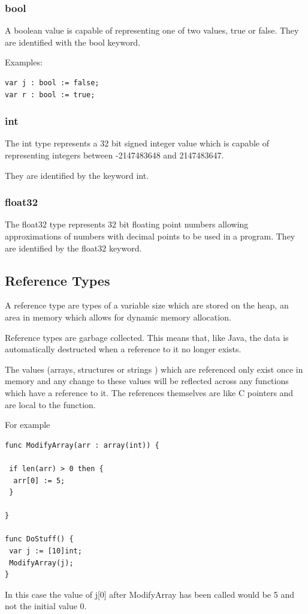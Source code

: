 \documentclass[]{final_report}
\begin{document}
\subsubsection{bool}

A boolean value is capable of representing one of two values, true or false. They are identified with the bool keyword.

Examples:
\begin{verbatim}
var j : bool := false;
var r : bool := true;
\end{verbatim}

\subsubsection{int}

The int type represents a 32 bit signed integer value which is capable of representing integers between -2147483648 and 2147483647.

They are identified by the keyword int. 

\subsubsection{float32}

The float32 type represents 32 bit floating point numbers allowing approximations of numbers with decimal points to be used in a program. They are identified by the float32 keyword.

\subsection{Reference Types}

A reference type are types of a variable size which are stored on the heap, an area in memory which allows for dynamic memory allocation.

Reference types are garbage collected. This means that, like Java, the data is automatically destructed when a reference to it no longer exists.

The values (arrays, structures or strings ) which are referenced only exist once in memory and any change to these values will be reflected across any functions which have a reference to it. The references themselves are like C pointers and are local to the function.

For example
\begin{verbatim}
func ModifyArray(arr : array(int)) {

 if len(arr) > 0 then {
  arr[0] := 5;
 }

}

func DoStuff() {
 var j := [10]int;
 ModifyArray(j);
}
\end{verbatim}
In this case the value of j[0] after ModifyArray has been called would be 5 and not the initial value 0.
\end{document}
